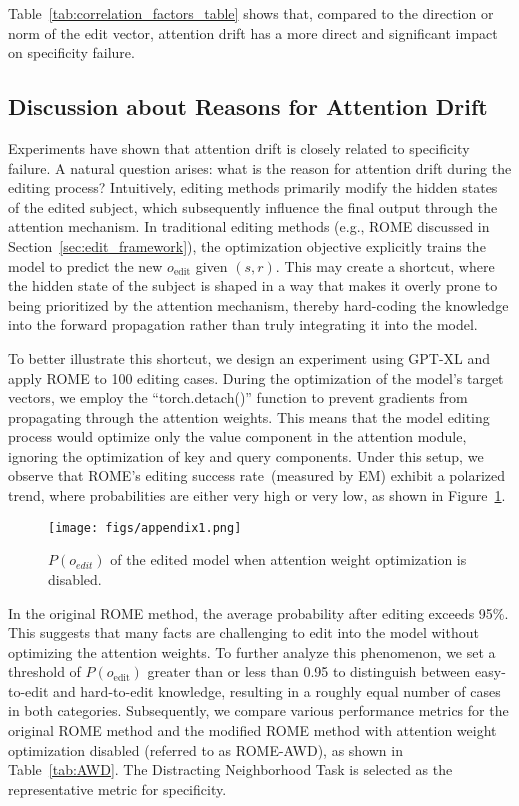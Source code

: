 Table~\ref{tab:correlation_factors_table} shows that, compared to the direction or norm of the edit vector, attention drift has a more direct and significant impact on specificity failure.

\subsection{Discussion about Reasons for Attention Drift}

Experiments have shown that attention drift is closely related to specificity failure.
A natural question arises: what is the reason for attention drift during the editing process?
Intuitively, editing methods primarily modify the hidden states of the edited subject, which subsequently influence the final output through the attention mechanism. 
In traditional editing methods (e.g., ROME discussed in Section~\ref{sec:edit_framework}), the optimization objective explicitly trains the model to predict the new \(o_{\text{edit}}\) given \((s, r)\). 
This may create a shortcut, where the hidden state of the subject is shaped in a way that makes it overly prone to being prioritized by the attention mechanism, thereby hard-coding the knowledge into the forward propagation rather than truly integrating it into the model.

To better illustrate this shortcut, we design an experiment using GPT-XL and apply ROME to 100 editing cases. 
During the optimization of the model's target vectors, we employ the ``torch.detach()'' function to prevent gradients from propagating through the attention weights. 
This means that the model editing process would optimize only the value component in the attention module, ignoring the optimization of key and query components. 
Under this setup, we observe that ROME's editing success rate~(measured by EM) exhibit a polarized trend, where probabilities are either very high or very low, as shown in Figure~\ref{fig:appendix1}.
\begin{figure}[htbp]
  \centering
  \texttt{[image: figs/appendix1.png]}
  \caption{$P(o_{edit})$ of the edited model when attention weight optimization is disabled.} %
  \label{fig:appendix1}
\end{figure}

In the original ROME method, the average probability after editing exceeds 95\%. 
This suggests that many facts are challenging to edit into the model without optimizing the attention weights.
To further analyze this phenomenon, we set a threshold of $P(o_{\text{edit}})$ greater than or less than 0.95 to distinguish between easy-to-edit and hard-to-edit knowledge, resulting in a roughly equal number of cases in both categories.
Subsequently, we compare various performance metrics for the original ROME method and the modified ROME method with attention weight optimization disabled (referred to as ROME-AWD), as shown in Table~\ref{tab:AWD}. The Distracting Neighborhood Task is selected as the representative metric for specificity.


